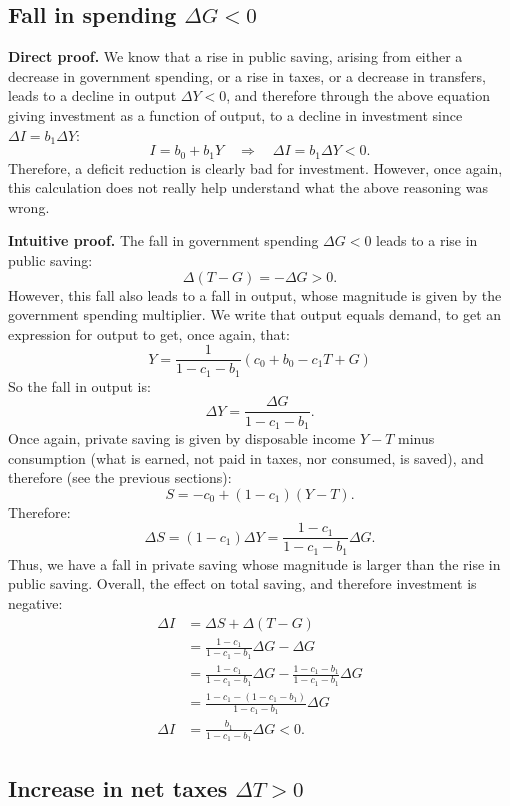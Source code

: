 \documentclass[]{book}
\theoremstyle{definition}
\theoremstyle{definition}
\theoremstyle{definition}
\theoremstyle{remark}
\begin{document}
\subsection{\texorpdfstring{Fall in spending
\(\Delta G<0\)}{Fall in spending \textbackslash{}Delta G\textless{}0}}\label{fall-in-spending-delta-g0-1}

\textbf{Direct proof.} We know that a rise in public saving, arising
from either a decrease in government spending, or a rise in taxes, or a
decrease in transfers, leads to a decline in output \(\Delta Y<0\), and
therefore through the above equation giving investment as a function of
output, to a decline in investment since \(\Delta I=b_{1}\Delta Y\):
\[I=b_{0}+b_{1}Y\quad\Rightarrow\quad\Delta I=b_{1}\Delta Y<0.\]
Therefore, a deficit reduction is clearly bad for investment. However,
once again, this calculation does not really help understand what the
above reasoning was wrong.

\textbf{Intuitive proof.} The fall in government spending \(\Delta G<0\)
leads to a rise in public saving: \[\Delta(T-G)=-\Delta G>0.\] However,
this fall also leads to a fall in output, whose magnitude is given by
the government spending multiplier. We write that output equals demand,
to get an expression for output to get, once again, that:
\[Y=\frac{1}{1-c_{1}-b_{1}}\left(c_{0}+b_{0}-c_{1}T+G\right)\] So the
fall in output is: \[\Delta Y=\frac{\Delta G}{1-c_{1}-b_{1}}.\] Once
again, private saving is given by disposable income \(Y-T\) minus
consumption (what is earned, not paid in taxes, nor consumed, is saved),
and therefore (see the previous sections):
\[S=-c_{0}+\left(1-c_{1}\right)\left(Y-T\right).\] Therefore:
\[\Delta S=(1-c_{1})\Delta Y=\frac{1-c_{1}}{1-c_{1}-b_{1}}\Delta G.\]
Thus, we have a fall in private saving whose magnitude is larger than
the rise in public saving. Overall, the effect on total saving, and
therefore investment is negative: \[
\begin{aligned}
\Delta I    &=\Delta S+\Delta(T-G)\\
&=\frac{1-c_{1}}{1-c_{1}-b_{1}}\Delta G-\Delta G\\
&=\frac{1-c_{1}}{1-c_{1}-b_{1}}\Delta G-\frac{1-c_{1}-b_{1}}{1-c_{1}-b_{1}}\Delta G\\
&=\frac{1-c_{1}-(1-c_{1}-b_{1})}{1-c_{1}-b_{1}}\Delta G\\
\Delta I &=\frac{b_{1}}{1-c_{1}-b_{1}}\Delta G<0.
\end{aligned}
\]

\subsection{\texorpdfstring{Increase in net taxes
\(\Delta T>0\)}{Increase in net taxes \textbackslash{}Delta T\textgreater{}0}}\label{increase-in-net-taxes-delta-t0-1}
\end{document}
